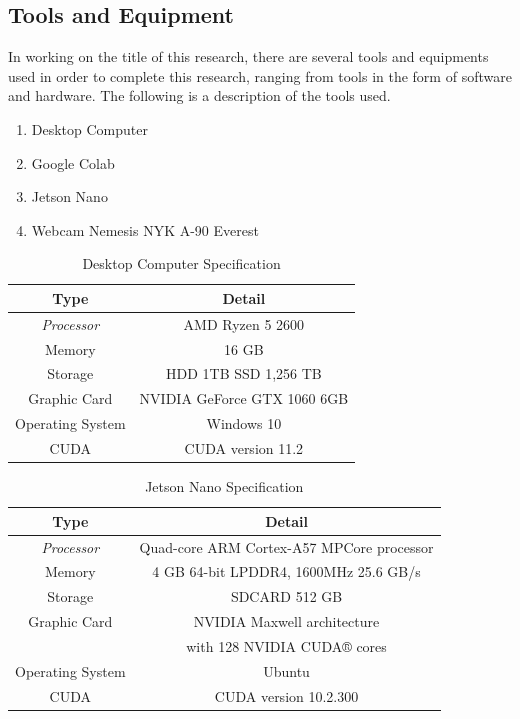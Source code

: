 \subsection{Tools and Equipment}
\label{subsec:toolsandequipment}

\par In working on the title of this research, there are several tools and equipments used in order to complete this research, ranging from tools in the form of software and hardware. The following is a description of the tools used.

\begin{enumerate}[nolistsep]
  \item Desktop Computer
  \item Google Colab
  \item Jetson Nano
  \item Webcam Nemesis NYK A-90 Everest
\end{enumerate}

\begin{table} [ht]
  \caption{Desktop Computer Specification}
  \label{tab:desktopspec}
  \centering
  \begin{tabular}{|c|c|}
    \hline
    \textbf{Type} & \textbf{Detail}  \\
    \hline
    \textit{Processor} & AMD Ryzen 5 2600 \\ 
    Memory             & 16 GB  \\
    Storage            & HDD 1TB SSD 1,256 TB\\
    Graphic Card       & NVIDIA GeForce GTX 1060 6GB \\
    Operating System   & Windows 10     \\
    CUDA               & CUDA version 11.2    \\              
    \hline
  \end{tabular}
\end{table}

\begin{table} [ht]
  \caption{Jetson Nano Specification}
  \label{tab:jetsonspec}
  \centering
  \begin{tabular}{|c|c|}
    \hline
    \textbf{Type} & \textbf{Detail}  \\
    \hline
    \textit{Processor} & Quad-core ARM Cortex-A57 MPCore processor \\ 
    Memory             & 4 GB 64-bit LPDDR4, 1600MHz 25.6 GB/s  \\
    Storage            & SDCARD 512 GB\\
    Graphic Card       & NVIDIA Maxwell architecture \\
                      & with 128 NVIDIA CUDA® cores \\
    Operating System   & Ubuntu     \\
    CUDA               & CUDA version 10.2.300    \\              
    \hline
  \end{tabular}
\end{table}


